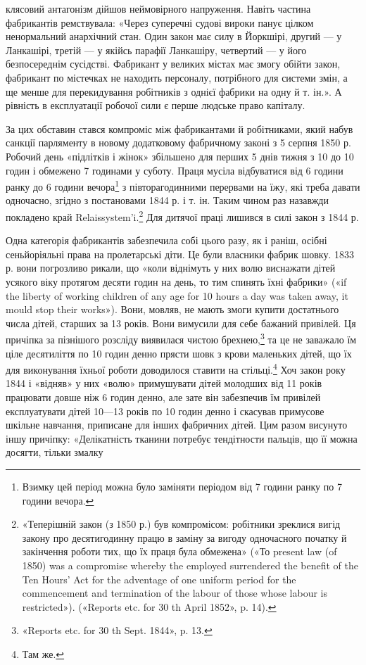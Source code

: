 \parcont{}  %
клясовий антагонізм дійшов неймовірного напруження. Навіть
частина фабрикантів ремствувала: «Через суперечні судові
вироки панує цілком ненормальний анархічний стан. Один закон
має силу в Йоркшірі, другий — у Ланкашірі, третій — у якійсь
парафії Ланкашіру, четвертий — у його безпосереднім сусідстві.
Фабрикант у великих містах має змогу обійти закон, фабрикант
по містечках не находить персоналу, потрібного для системи змін,
а ще менше для перекидування робітників з однієї фабрики на
одну й т. ін.». А рівність в експлуатації робочої сили є перше
людське право капіталу.

За цих обставин стався компроміс між фабрикантами й робітниками,
який набув санкції парляменту в новому додатковому
фабричному законі з 5 серпня 1850 р. Робочий день «підлітків
і жінок» збільшено для перших 5 днів тижня з 10 до 10 годин
і обмежено 7 годинами у суботу. Праця мусіла відбуватися від
6 години ранку до 6 години вечора\footnote{
Взимку цей період можна було заміняти періодом від 7 години
ранку по 7 години вечора.
} з півторагодинними перервами
на їжу, які треба давати одночасно, згідно з постановами
1844 р. і т. ін. Таким чином раз назавжди покладено край
Relaissystem’i.\footnote{
«Теперішній закон (з 1850 р.) був компромісом: робітники зреклися
вигід закону про десятигодинну працю в заміну за вигоду одночасного
початку й закінчення роботи тих, що їх праця була обмежена» («То
present law (of 1850) was a compromise whereby the employed surrendered
the benefit of the Ten Hours’ Act for the adventage of one uniform period
for the commencement and termination of the labour of those whose labour
is restricted»). («Reports etc. for 30 th April 1852», p. 14).
} Для дитячої праці лишився в силі закон з
1844 р.

Одна категорія фабрикантів забезпечила собі цього разу,
як і раніш, осібні сеньйоріяльні права на пролетарські діти. Це
були власники фабрик шовку. 1833 р. вони погрозливо рикали,
що «коли віднімуть у них волю виснажати дітей усякого віку
протягом десяти годин на день, то тим спинять їхні фабрики»
(«if the liberty of working children of any age for 10 hours a day
was taken away, it mould stop their works»). Вони, мовляв, не
мають змоги купити достатнього числа дітей, старших за 13 років.
Вони вимусили для себе бажаний привілей. Ця причіпка за пізнішого
розсліду виявилася чистою брехнею,\footnote{
«Reports etc. for 30 th Sept. 1844», p. 13.
} та це не заважало
їм ціле десятиліття по 10 годин денно прясти шовк з крови
маленьких дітей, що їх для виконування їхньої роботи доводилося
ставити на стільці.\footnote{
Там же.
} Хоч закон року 1844 і «відняв» у них
«волю» примушувати дітей молодших від 11 років працювати
довше ніж 6 годин денно, але зате він забезпечив їм привілей
експлуатувати дітей 10—13 років по 10 годин денно і скасував
примусове шкільне навчання, приписане для інших фабричних
дітей. Цим разом висунуто іншу причіпку: «Делікатність тканини
потребує тендітности пальців, що її можна досягти, тільки змалку
\parbreak{}  %
